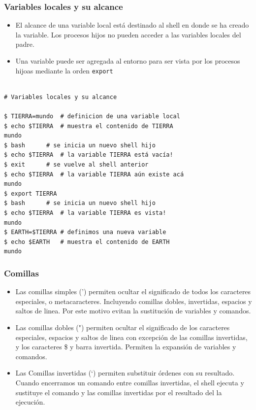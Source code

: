 \documentclass{beamer}
\begin{document}
\begin{frame}{}
\frametitle{Variables locales y su alcance}
\begin{itemize}
\item El alcance de una variable local está destinado al shell en donde se ha creado la variable. Los procesos hijos no pueden acceder a las variables locales del padre.
\item Una variable puede ser agregada al entorno para ser vista por los procesos hijoas mediante la orden \texttt{export}
\end{itemize}
\end{frame}{}

\begin{Verbatim}

# Variables locales y su alcance

$ TIERRA=mundo	# definicion de una variable local
$ echo $TIERRA	# muestra el contenido de TIERRA
mundo
$ bash		# se inicia un nuevo shell hijo
$ echo $TIERRA	# la variable TIERRA está vacía!
$ exit		# se vuelve al shell anterior
$ echo $TIERRA	# la variable TIERRA aún existe acá
mundo
$ export TIERRA
$ bash		# se inicia un nuevo shell hijo
$ echo $TIERRA	# la variable TIERRA es vista!
mundo
$ EARTH=$TIERRA	# definimos una nueva variable
$ echo $EARTH	# muestra el contenido de EARTH
mundo
\end{Verbatim}

\begin{frame}{}
\frametitle{Comillas}
\begin{itemize}
\item Las comillas simples (') permiten ocultar el significado de todos los caracteres 
		especiales, o metacaracteres. Incluyendo comillas dobles, 
		invertidas, espacios y saltos de linea. Por este motivo evitan 
		la sustitución de variables y comandos.
\item Las comillas dobles (") permiten ocultar el significado de los caracteres especiales, 
 		espacios y saltos de linea con excepción de las comillas 
 		invertidas, y los caracteres \$ y barra invertida. Permiten la expansión de variables y comandos.
\item
Las Comillas invertidas (`) permiten substituir órdenes con su resultado.
		Cuando encerramos un comando entre comillas invertidas, el shell 
ejecuta y 
		sustituye el comando y las comillas invertidas por el resultado del 
		la ejecución.
\end{itemize}
\end{frame}{}
\end{document}

